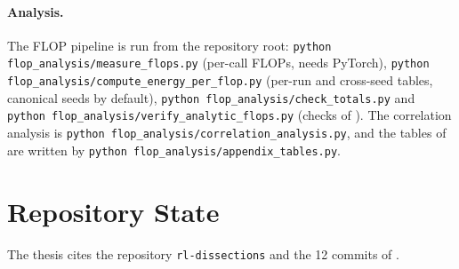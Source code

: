 \paragraph{Analysis.} The FLOP pipeline is run from the repository root: \texttt{python flop\_analysis/measure\_flops.py} (per-call FLOPs, needs PyTorch), \texttt{python flop\_analysis/compute\_energy\_per\_flop.py} (per-run and cross-seed tables, canonical seeds by default), \texttt{python flop\_analysis/check\_totals.py} and \texttt{python flop\_analysis/verify\_analytic\_flops.py} (checks of ).
The correlation analysis is \texttt{python flop\_analysis/correlation\_analysis.py}, and the tables of  are written by \texttt{python flop\_analysis/appendix\_tables.py}.

\section{Repository State}\label{sec:app-repro-repo}

The thesis cites the repository \texttt{rl-dissections} and the \num{12} commits of .
